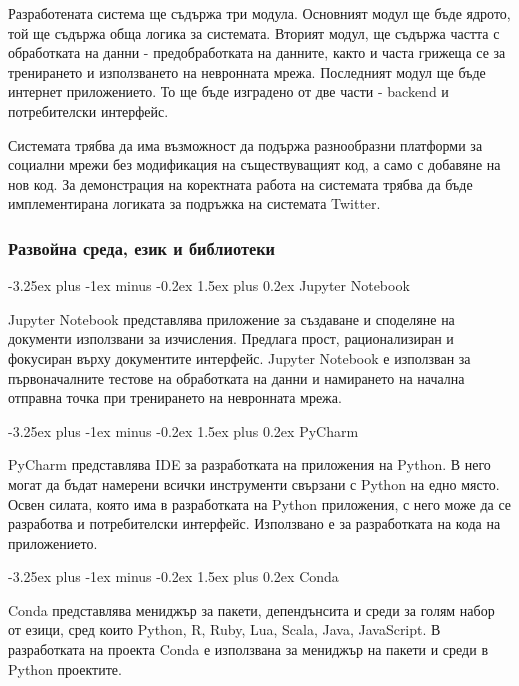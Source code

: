 \documentclass{article}
\makeatletter
\newcounter{subsubsubsection}[subsubsection]
\renewcommand\paragraph{\@startsection{paragraph}{5}{\z@}%
{3.25ex \@plus1ex \@minus.2ex}%
{-1em}%
{\normalfont\normalsize\bfseries}}
\renewcommand{\paragraph}{\@startsection{paragraph}{4}{0ex}%
{-3.25ex plus -1ex minus -0.2ex}%
{1.5ex plus 0.2ex}%
{\normalfont\normalsize\bfseries}}
\makeatother
\begin{document}
Разработената система ще съдържа три модула. Основният модул ще бъде ядрото, той ще съдържа обща логика за системата.
Вторият модул, ще съдържа частта с обработката на данни - предобработката на данните, както и часта грижеща се за
тренирането и използването на невронната мрежа. Последният модул ще бъде интернет приложението. То ще бъде изградено от
две части - backend и потребителски интерфейс.

Системата трябва да има възможност да подържа разнообразни платформи за социални мрежи без модификация на
съществуващият код, а само с добавяне на нов код. За демонстрация на коректната работа на системата трябва да бъде
имплементирана логиката за подръжка на системата Twitter.

\subsubsection{Развойна среда, език и библиотеки}


\paragraph{Jupyter Notebook}

Jupyter Notebook представлява приложение за създаване и споделяне на документи използвани за изчисления. Предлага прост,
рационализиран и фокусиран върху документите интерфейс. \cite{jupyter} Jupyter Notebook е използван за първоначалните
тестове на обработката на данни и намирането на начална отправна точка при тренирането на невронната мрежа.

\paragraph{PyCharm}

PyCharm представлява IDE за разработката на приложения на Python. В него могат да бъдат намерени всички инструменти
свързани с Python на едно място. Освен силата, която има в разработката на Python приложения, с него може да се
разработва и потребителски интерфейс. \cite{pycharm} Използвано е за разработката на кода на приложението.

\paragraph{Conda}

Conda представлява мениджър за пакети, депендънсита и среди за голям набор от езици, сред които Python, R, Ruby, Lua,
Scala, Java, JavaScript. \cite{conda} В разработката на проекта Conda е използвана за мениджър на пакети и среди в
Python проектите.
\end{document}
